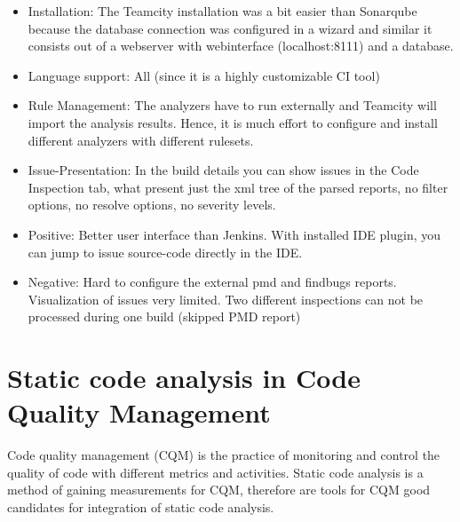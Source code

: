 \documentclass[conference]{IEEEtran}
\begin{document}
\begin{itemize}
	\item Installation: The Teamcity installation was a bit easier than Sonarqube because the database connection was configured in a wizard and similar it consists out of a webserver with webinterface (localhost:8111) and a database.
	
	\item Language support: All (since it is a highly customizable CI tool)
	
	\item Rule Management: The analyzers have to run externally and Teamcity will import the analysis results.
	Hence, it is much effort to configure and install different analyzers with different rulesets.
	
	\item Issue-Presentation: In the build details you can show issues in the Code Inspection tab, what present just the xml tree of the parsed reports, no filter options, no resolve options, no severity levels.
	
	\item Positive: Better user interface than Jenkins. With installed IDE plugin, you can jump to issue source-code directly in the IDE. 
	
	\item Negative: Hard to configure the external pmd and findbugs reports. Visualization of issues very limited. Two different inspections can not be processed during one build (skipped PMD report)
	
\end{itemize}





\section{Static code analysis in Code Quality Management}
\label{sec:static_code_analysis_code_quality_management}
Code quality management (CQM) is the practice of monitoring and control the quality of code with different metrics and activities.
Static code analysis is a method of gaining measurements for CQM, therefore are tools for CQM good candidates for integration of static code analysis.

\end{document}
